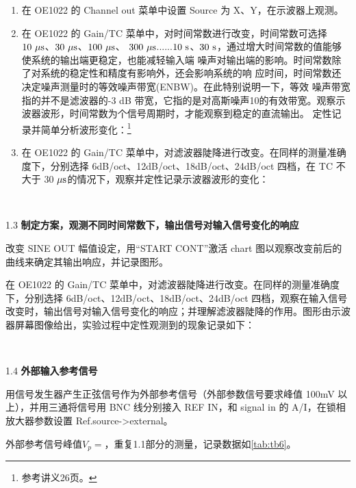 \documentclass[11pt,a4paper]{ctexart}
\newcommand{\unit}[1]{\rm \ #1}
\newcommand{\emptyline}{\par \ \\ }
\begin{document}
\begin{enumerate}
\item 在 OE1022 的 Channel out 菜单中设置 Source 为 X、Y，在示波器上观测。
\item 在 OE1022 的 Gain/TC 菜单中，对时间常数进行改变，时间常数可选择 $10\unit{\mu s}$、$30\unit{\mu s}$、$100\unit{\mu s}$、 $300\unit{\mu s}$......$10\unit s$、$30\unit s$，通过增大时间常数的值能够使系统的输出端更稳定，也能减轻输入端 噪声对输出端的影响。时间常数除了对系统的稳定性和精度有影响外，还会影响系统的响 应时间，时间常数还决定噪声测量时的等效噪声带宽(ENBW)。在此特别说明一下，等效 噪声带宽指的并不是滤波器的-3 dB 带宽，它指的是对高斯噪声10的有效带宽。观察示波器波形，时间常数为\uline{\hspace{2cm}}个信号周期时，才能观察到稳定的直流输出。
定性记录并简单分析波形变化：\footnote{参考讲义26页。}
\vspace{5cm}
\item 在 OE1022 的 Gain/TC 菜单中，对滤波器陡降进行改变。在同样的测量准确度下，分别选择 6dB/oct、12dB/oct、18dB/oct、24dB/oct 四档，在 TC 不大于 30$\unit{\mu s}$的情况下，观察并定性记录示波器波形的变化：
\vspace{5cm}


\end{enumerate}
\emptyline
\par
1.3 \textbf{制定方案，观测不同时间常数下，输出信号对输入信号变化的响应}
\par
改变 SINE OUT 幅值设定，用“START CONT”激活 chart 图以观察改变前后的曲线来确定其输出响应，并记录图形。
\par
在 OE1022 的 Gain/TC 菜单中，对滤波器陡降进行改变。在同样的测量准确度下，分别选择 6dB/oct、12dB/oct、18dB/oct、24dB/oct 四档，观察在输入信号改变时，输出信号对输入信号变化的响应；并理解滤波器陡降的作用。图形由示波器屏幕图像给出，实验过程中定性观测到的现象记录如下：
\vspace{5cm}
\emptyline
\par
1.4 \textbf{外部输入参考信号}
\par
用信号发生器产生正弦信号作为外部参考信号（外部参数信号要求峰值 100mV 以上），并用三通将信号用 BNC 线分别接入 REF IN，和 signal in 的 A/I，在锁相放大器参数设置 Ref.source->external。
\par
外部参考信号峰值$V_p = $\uline{\hspace{2cm}}，重复1.1部分的测量，记录数据如\cref{tab:tb6}。
\end{document}
